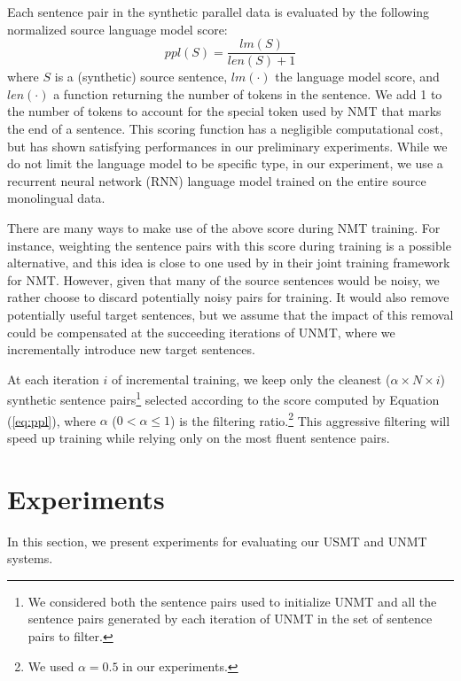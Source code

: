 \documentclass[11pt,a4paper]{article}
\newcommand{\Eq}[1]{{Equation (\ref{eq:#1})}}
\begin{document}
Each sentence pair in the synthetic parallel data is evaluated by the following normalized source language model score:
\begin{equation}
\label{eq:ppl}
ppl(S) = \frac{lm(S)}{len(S)+1}
\end{equation}
where $S$ is a (synthetic) source sentence, $lm(\cdot)$ the language model score, and $len(\cdot)$ a function returning the number of tokens in the sentence. We add 1 to the number of tokens to account for the special token used by NMT that marks the end of a sentence. This scoring function has a negligible computational cost, but has shown satisfying performances in our preliminary experiments.  While we do not limit the language model to be specific type, in our experiment, we use a recurrent neural network (RNN) language model trained on the entire source monolingual data. 

There are many ways to make use of the above score during NMT training. For instance, weighting the sentence pairs with this score during training is a possible alternative, and this idea is close to one used by \citet{ijcai2017-555} in their joint training framework for NMT. However, given that many of the source sentences would be noisy, we rather choose to discard potentially noisy pairs for training. It would also remove potentially useful target sentences, but we assume that the impact of this removal could be compensated at the succeeding iterations of UNMT, where we incrementally introduce new target sentences.

At each iteration $i$ of incremental training, we keep only the cleanest ($\alpha\times N\times i$) synthetic sentence pairs\footnote{We considered both the sentence pairs used to initialize UNMT and all the sentence pairs generated by each iteration of UNMT in the set of sentence pairs to filter.} selected according to the score computed by \Eq{ppl}, where $\alpha$ ($0<\alpha\le 1$) is the filtering ratio.\footnote{We used $\alpha=0.5$ in our experiments.} This aggressive filtering will speed up training while relying only on the most fluent sentence pairs.

\section{Experiments}
\label{section:exp}
In this section, we present experiments for evaluating our USMT and UNMT systems.
\end{document}
